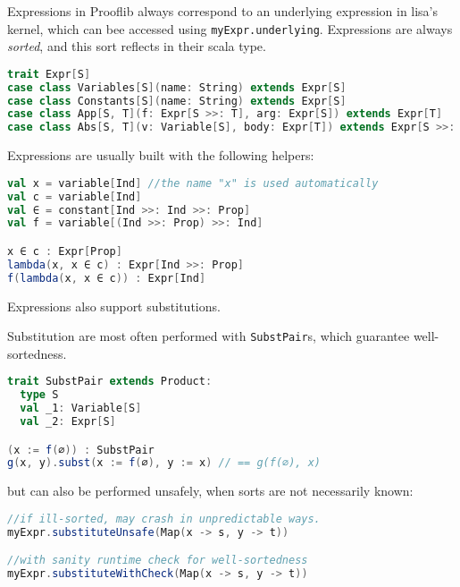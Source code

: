 \begin{definition}[Expressions]
  Expressions in Prooflib always correspond to an underlying expression in lisa's kernel, which can bee accessed using \lstinline|myExpr.underlying|. Expressions are always \textit{sorted}, and this sort reflects in their scala type.
  \begin{lstlisting}[language=scala]
trait Expr[S]
case class Variables[S](name: String) extends Expr[S]
case class Constants[S](name: String) extends Expr[S]
case class App[S, T](f: Expr[S >>: T], arg: Expr[S]) extends Expr[T]
case class Abs[S, T](v: Variable[S], body: Expr[T]) extends Expr[S >>: T]
  \end{lstlisting}
\end{definition}
\noindent
Expressions are usually built with the following helpers:
\begin{example}\phantom{.}

  \begin{lstlisting}[language=scala]
val x = variable[Ind] //the name "x" is used automatically
val c = variable[Ind]
val ∈ = constant[Ind >>: Ind >>: Prop]
val f = variable[(Ind >>: Prop) >>: Ind]

x ∈ c : Expr[Prop]
lambda(x, x ∈ c) : Expr[Ind >>: Prop]
f(lambda(x, x ∈ c)) : Expr[Ind]
  \end{lstlisting}

\end{example}

Expressions also support substitutions.

\begin{definition}[Substitution]\phantom{.}
  Substitution are most often performed with \lstinline|SubstPair|s, which guarantee well-sortedness.
  \begin{lstlisting}[language=scala]
trait SubstPair extends Product:
  type S
  val _1: Variable[S]
  val _2: Expr[S]

(x := f(∅)) : SubstPair
g(x, y).subst(x := f(∅), y := x) // == g(f(∅), x)
  \end{lstlisting}
\noindent
  but can also be performed unsafely, when sorts are not necessarily known:
  \begin{lstlisting}[language=scala]
//if ill-sorted, may crash in unpredictable ways.
myExpr.substituteUnsafe(Map(x -> s, y -> t)) 

//with sanity runtime check for well-sortedness
myExpr.substituteWithCheck(Map(x -> s, y -> t))
  \end{lstlisting}
\end{definition}

